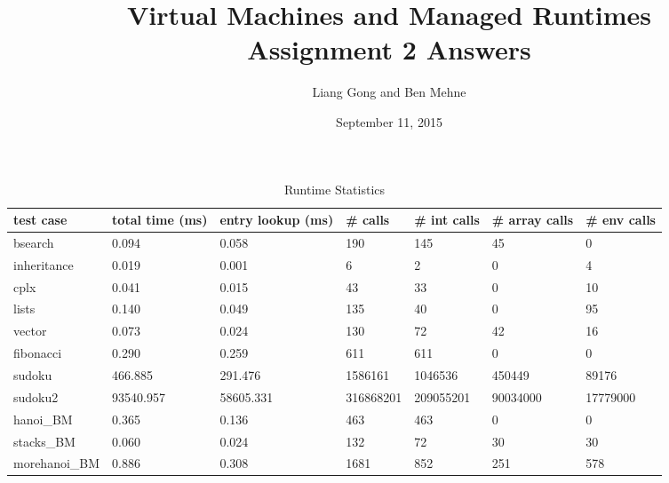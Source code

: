 \documentclass[notitlepage]{report}
\title{\vspace{-0.5in}Virtual Machines and Managed Runtimes \\ Assignment 2 Answers}
\date{\vspace{-0.5in}September 11, 2015}
\author{\vspace{-0.5in}Liang Gong and Ben Mehne\vspace{-0.5in}}
\begin{document}
\maketitle

\begin{table}[!htp]
\centering
\caption{Runtime Statistics}
\label{statistics}
{\footnotesize
\begin{tabular}{lllllll}
\toprule
test case & total time (ms)    & entry lookup (ms) & \# calls & \# int calls & \# array calls & \# env calls \\
\midrule
bsearch       & 0.094                 & 0.058        & 190              & 145                & 45               & 0        \\
inheritance   & 0.019                 & 0.001        & 6                & 2                  & 0                & 4        \\
cplx          & 0.041                 & 0.015        & 43               & 33                 & 0                & 10       \\
lists         & 0.140                 & 0.049        & 135              & 40                 & 0                & 95       \\
vector        & 0.073                 & 0.024        & 130              & 72                 & 42               & 16       \\
fibonacci     & 0.290                 & 0.259        & 611              & 611                & 0                & 0        \\
sudoku        & 466.885               & 291.476      & 1586161          & 1046536            & 450449           & 89176    \\
sudoku2       & 93540.957             & 58605.331    & 316868201        & 209055201          & 90034000         & 17779000 \\
hanoi\_BM     & 0.365                 & 0.136        & 463              & 463                & 0                & 0        \\
stacks\_BM    & 0.060                 & 0.024        & 132              & 72                 & 30               & 30       \\
morehanoi\_BM & 0.886                 & 0.308        & 1681             & 852                & 251              & 578      \\
\bottomrule
\end{tabular}
}
\end{table}
\end{document}
